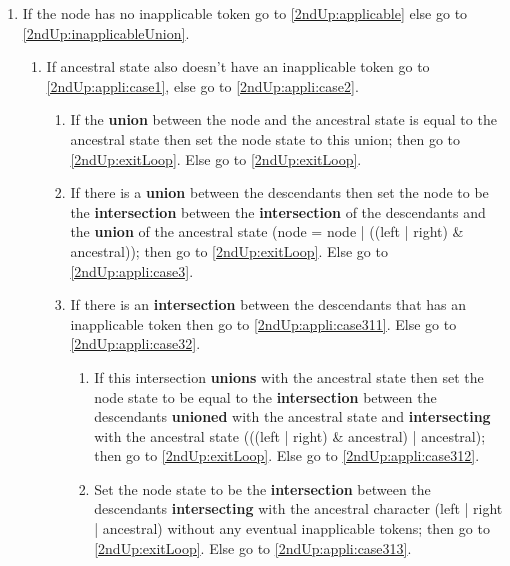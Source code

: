 \documentclass[a4paper,12pt]{article}
\begin{document}
  
\begin{enumerate}
    \item If the node has no inapplicable token go to \ref{2ndUp:applicable} else go to \ref{2ndUp:inapplicableUnion}.
    \begin{enumerate}
        \item \label{2ndUp:applicable} If ancestral state also doesn't have an inapplicable token go to \ref{2ndUp:appli:case1}, else go to \ref{2ndUp:appli:case2}.
        \begin{enumerate}
            \item \label{2ndUp:appli:case1} If the \textbf{union} between the node and the ancestral state is equal to the ancestral state then set the node state to this union; then go to \ref{2ndUp:exitLoop}. Else go to \ref{2ndUp:exitLoop}. %
            
            \item \label{2ndUp:appli:case2} If there is a \textbf{union} between the descendants then set the node to be the \textbf{intersection} between the \textbf{intersection} of the descendants and the \textbf{union} of the ancestral state (node = node | ((left | right) \& ancestral)); then go to \ref{2ndUp:exitLoop}. Else go to \ref{2ndUp:appli:case3}.
            
            \item \label{2ndUp:appli:case3} If there is an \textbf{intersection} between the descendants that has an inapplicable token then go to \ref{2ndUp:appli:case311}. Else go to \ref{2ndUp:appli:case32}.
            \begin{enumerate}
    
                    \item \label{2ndUp:appli:case311} If this intersection \textbf{unions} with the ancestral state then set the node state to be equal to the \textbf{intersection} between the descendants \textbf{unioned} with the ancestral state and \textbf{intersecting} with the ancestral state (((left | right) \& ancestral) | ancestral); then go to \ref{2ndUp:exitLoop}. Else go to \ref{2ndUp:appli:case312}.
                    
                    \item \label{2ndUp:appli:case312} Set the node state to be the \textbf{intersection} between the descendants \textbf{intersecting} with the ancestral character (left | right | ancestral) without any eventual inapplicable tokens; then go to \ref{2ndUp:exitLoop}. Else go to \ref{2ndUp:appli:case313}.
                    

\end{enumerate}
\end{enumerate}
\end{enumerate}
\end{enumerate}
\end{document}
